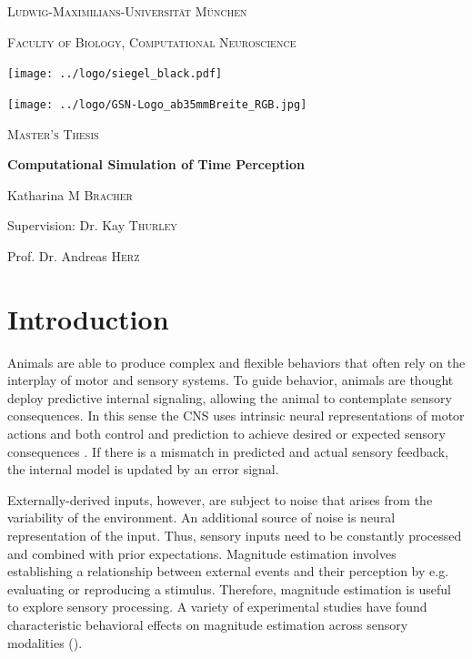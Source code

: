 \documentclass[10pt]{article}
\begin{document}
\begin{titlepage}
	\centering
	{\scshape\LARGE Ludwig-Maximilians-Universität München \par}
	{\scshape\large Faculty of Biology, Computational Neuroscience \par}
	\vspace{0.5cm}
	\texttt{[image: ../logo/siegel\_black.pdf]}\par
	\texttt{[image: ../logo/GSN-Logo\_ab35mmBreite\_RGB.jpg]}\par
	\vspace{0.7cm}
	{\scshape\LARGE Master's Thesis \par}
	\vspace{0.05cm}
	\vspace{0.05cm}
	{\huge\bfseries Computational Simulation of Time Perception \par}
	\vspace{1.4cm}
	{\Large Katharina \textsc{M Bracher} \par}
	\vspace{0.5cm}
	{\large Supervision: Dr. Kay \textsc{Thurley} \par}
	{\large Prof. Dr. Andreas \textsc{Herz} \par}
\end{titlepage}


\normalsize
\tableofcontents

\pagebreak


\section{Introduction}
Animals are able to produce complex and flexible behaviors that often rely on the interplay of motor and sensory systems.
To guide behavior, animals are thought deploy predictive internal signaling, allowing the animal to contemplate sensory consequences. 
In this sense the CNS uses intrinsic neural representations of motor actions and both control and prediction to achieve desired or expected sensory consequences \cite{Straka2018}.
If there is a mismatch in predicted and actual sensory feedback, the internal model is updated by an error signal. 

Externally-derived inputs, however, are subject to noise that arises from the variability of the environment. An additional source of noise is neural representation of the input.
Thus, sensory inputs need to be constantly processed and combined with prior expectations.
Magnitude estimation involves establishing a relationship between external events and their perception by e.g. evaluating or reproducing a stimulus. Therefore, magnitude estimation is useful to explore sensory processing. 
A variety of experimental studies have found characteristic behavioral effects on magnitude estimation across sensory modalities (\cite{Petzschner2015}).
\end{document}
